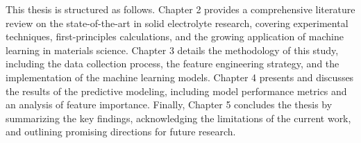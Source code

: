 This thesis is structured as follows. Chapter 2 provides a comprehensive literature review on the state-of-the-art in solid electrolyte research, covering experimental techniques, first-principles calculations, and the growing application of machine learning in materials science. Chapter 3 details the methodology of this study, including the data collection process, the feature engineering strategy, and the implementation of the machine learning models. Chapter 4 presents and discusses the results of the predictive modeling, including model performance metrics and an analysis of feature importance. Finally, Chapter 5 concludes the thesis by summarizing the key findings, acknowledging the limitations of the current work, and outlining promising directions for future research.

